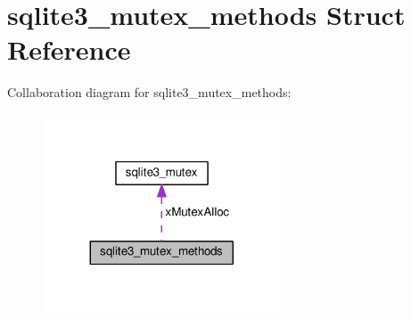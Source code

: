 \hypertarget{structsqlite3__mutex__methods}{}\section{sqlite3\+\_\+mutex\+\_\+methods Struct Reference}
\label{structsqlite3__mutex__methods}


Collaboration diagram for sqlite3\+\_\+mutex\+\_\+methods\+:\nopagebreak
\begin{figure}[H]
\begin{center}
\leavevmode
\includegraphics[width=200pt]{structsqlite3__mutex__methods__coll__graph}
\end{center}
\end{figure}
